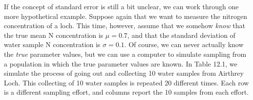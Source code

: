 \documentclass[
]{scrbook}
\begin{document}
If the concept of standard error is still a bit unclear, we can work through one more hypothetical example.
Suppose again that we want to measure the nitrogen concentration of a loch.
This time, however, assume that we somehow \emph{know} that the true mean N concentration is \(\mu = 0.7\), and that the standard deviation of water sample N concentration is \(\sigma = 0.1\).
Of course, we can never actually know the \emph{true} parameter values, but we can use a computer to simulate sampling from a population in which the true parameter values are known.
In Table 12.1, we simulate the process of going out and collecting 10 water samples from Airthrey Loch.
This collecting of 10 water samples is repeated 20 different times.
Each row is a different sampling effort, and columns report the 10 samples from each effort.
\end{document}
